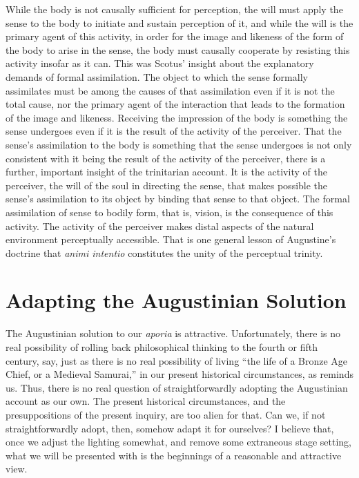 \documentclass[12pt]{article}
\begin{document}
While the body is not causally sufficient for perception, the will must apply the sense to the body to initiate and sustain perception of it, and while the will is the primary agent of this activity, in order for the image and likeness of the form of the body to arise in the sense, the body must causally cooperate by resisting this activity insofar as it can. This was Scotus' insight about the explanatory demands of formal assimilation. The object to which the sense formally assimilates must be among the causes of that assimilation even if it is not the total cause, nor the primary agent of the interaction that leads to the formation of the image and likeness. Receiving the impression of the body is something the sense undergoes even if it is the result of the activity of the perceiver. That the sense's assimilation to the body is something that the sense undergoes is not only consistent with it being the result of the activity of the perceiver, there is a further, important insight of the trinitarian account. It is the activity of the perceiver, the will of the soul in directing the sense, that makes possible the sense's assimilation to its object by binding that sense to that object. The formal assimilation of sense to bodily form, that is, vision, is the consequence of this activity. The activity of the perceiver makes distal aspects of the natural environment perceptually accessible. That is one general lesson of Augustine's doctrine that \emph{animi intentio} constitutes the unity of the perceptual trinity.


\section{Adapting the Augustinian Solution} %
\label{sec:adapting_the_augustinian_solution}

The Augustinian solution to our \emph{aporia} is attractive. Unfortunately, there is no real possibility of rolling back philosophical thinking to the fourth or fifth century, say, just as there is no real possibility of living ``the life of a Bronze Age Chief, or a Medieval Samurai,'' in our present historical circumstances, as \citet[140]{Williams:1981rt} reminds us. Thus, there is no real question of straightforwardly adopting the Augustinian account as our own. The present historical circumstances, and the presuppositions of the present inquiry, are too alien for that. Can we, if not straightforwardly adopt, then, somehow adapt it for ourselves? I believe that, once we adjust the lighting somewhat, and remove some extraneous stage setting, what we will be presented with is the beginnings of a reasonable and attractive view.
\end{document}
